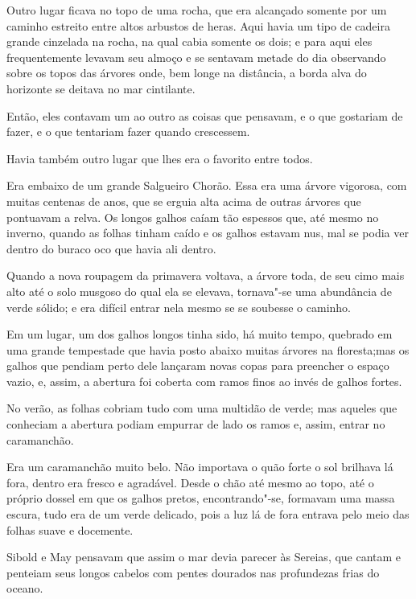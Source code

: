 Outro lugar ficava no topo de uma rocha, que era alcançado somente por
um caminho estreito entre altos arbustos de heras. Aqui havia um tipo de
cadeira grande cinzelada na rocha, na qual cabia somente os dois; e para
aqui eles frequentemente levavam seu almoço e se sentavam metade do dia
observando sobre os topos das árvores onde, bem longe na distância, a
borda alva do horizonte se deitava no mar cintilante.

Então, eles contavam um ao outro as coisas que pensavam, e o que
gostariam de fazer, e o que tentariam fazer quando crescessem.

Havia também outro lugar que lhes era o favorito entre todos.

Era embaixo de um grande Salgueiro Chorão. Essa era uma árvore vigorosa,
com muitas centenas de anos, que se erguia alta acima de outras árvores
que pontuavam a relva. Os longos galhos caíam tão espessos que, até
mesmo no inverno, quando as folhas tinham caído e os galhos estavam nus,
mal se podia ver dentro do buraco oco que havia ali dentro.

Quando a nova roupagem da primavera voltava, a árvore toda, de seu cimo
mais alto até o solo musgoso do qual ela se elevava, tornava"-se uma
abundância de verde sólido; e era difícil entrar nela mesmo se se
soubesse o caminho.

Em um lugar, um dos galhos longos tinha sido, há muito tempo, quebrado
em uma grande tempestade que havia posto abaixo muitas árvores na
floresta;mas os galhos que pendiam perto dele lançaram novas copas para
preencher o espaço vazio, e, assim, a abertura foi coberta com ramos
finos ao invés de galhos fortes.

No verão, as folhas cobriam tudo com uma multidão de verde; mas aqueles
que conheciam a abertura podiam empurrar de lado os ramos e, assim,
entrar no caramanchão.

Era um caramanchão muito belo. Não importava o quão forte o sol brilhava
lá fora, dentro era fresco e agradável. Desde o chão até mesmo ao topo,
até o próprio dossel em que os galhos pretos, encontrando"-se, formavam
uma massa escura, tudo era de um verde delicado, pois a luz lá de fora
entrava pelo meio das folhas suave e docemente.

Sibold e May pensavam que assim o mar devia parecer às Sereias, que
cantam e penteiam seus longos cabelos com pentes dourados nas
profundezas frias do oceano.

